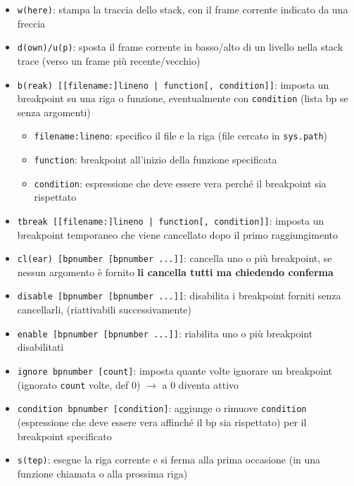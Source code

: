 \begin{itemize}
  \item \texttt{w(here)}: stampa la traccia dello stack, con il frame corrente indicato da una freccia
  \item \texttt{d(own)/u(p)}: sposta il frame corrente in basso/alto di un livello nella stack trace (verso un frame pi\`u recente/vecchio)
  \item \texttt{b(reak) [[filename:]lineno | function[, condition]]}: imposta un breakpoint su una riga o funzione, eventualmente con \texttt{condition} (lista bp se senza argomenti)
    \begin{itemize}
      \item \texttt{filename:lineno}: specifico il file e la riga (file cercato in \texttt{sys.path})
      \item \texttt{function}: breakpoint all'inizio della funzione specificata
      \item \texttt{condition}: espressione che deve essere vera perch\'e il breakpoint sia rispettato
    \end{itemize}
  \item \texttt{tbreak [[filename:]lineno | function[, condition]]}: imposta un breakpoint temporaneo che viene cancellato dopo il primo raggiungimento
  \item \texttt{cl(ear) [bpnumber [bpnumber ...]]}: cancella uno o pi\`u breakpoint, se nessun argomento \`e fornito \textbf{li cancella tutti ma chiedendo conferma}
  \item \texttt{disable [bpnumber [bpnumber ...]]}: disabilita i breakpoint forniti senza cancellarli, (riattivabili successivamente)
  \item \texttt{enable [bpnumber [bpnumber ...]]}: riabilita uno o pi\`u breakpoint disabilitati
  \item \texttt{ignore bpnumber [count]}: imposta quante volte ignorare un breakpoint (ignorato \texttt{count} volte, def 0) $\rightarrow$ a 0 diventa attivo
  \item \texttt{condition bpnumber [condition]}: aggiunge o rimuove \texttt{condition} (espressione che deve essere vera affinch\'e il bp sia rispettato) per il breakpoint specificato
  \item \texttt{s(tep)}: esegue la riga corrente e si ferma alla prima occasione (in una funzione chiamata o alla prossima riga)

\end{itemize}

